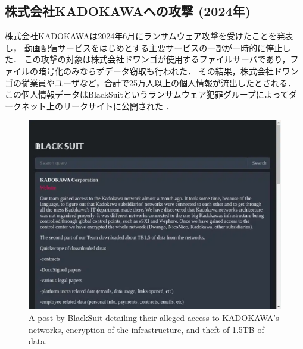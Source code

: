 \subsection{株式会社KADOKAWAへの攻撃 (2024年)}
株式会社KADOKAWAは2024年6月にランサムウェア攻撃を受けたことを発表し，
動画配信サービスをはじめとする主要サービスの一部が一時的に停止した\cite{kadokawa-apology}．
この攻撃の対象は株式会社ドワンゴが使用するファイルサーバであり，ファイルの暗号化のみならずデータ窃取も行われた．
その結果，株式会社ドワンゴの従業員やユーザなど，合計で25万人以上の個人情報が流出したとされる．
この個人情報データはBlackSuitというランサムウェア犯罪グループによってダークネット上のリークサイトに公開された \cite{kadokawa-leak-PPI}．
\begin{figure}[t]
  \begin{center}
    \includegraphics[width=\columnwidth]{doc/img/BlackSuit-2024-06-27-060714.eps}
  \end{center}
  \caption{A post by BlackSuit detailing their alleged access to KADOKAWA’s networks, encryption of the infrastructure,
    and theft of 1.5TB of data. \cite{kadokawa-leak-PPI}}
  \label{fig:kadokawa-leak}
\end{figure}

